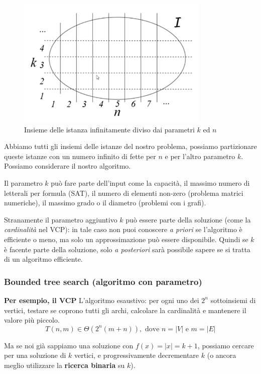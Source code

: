 \documentclass{article}
\begin{document}
\begin{figure}[H]
    \centering
    \includegraphics[scale=0.7]{images/param_coplx.png}
    \caption{Insieme delle istanza infinitamente diviso dai parametri $k$ ed $n$}
\end{figure}

Abbiamo tutti gli insiemi delle istanze del nostro problema, possiamo partizionare queste
istanze con un numero infinito di fette per $n$ e per l'altro parametro $k$. Possiamo
considerare il nostro algoritmo.

Il parametro $k$ può fare parte dell'input come la capacità, il massimo numero di
letterali per formula (SAT), il numero di elementi non-zero (problema matrici numeriche),
il massimo grado o il diametro (problemi con i grafi).

Stranamente il parametro aggiuntivo $k$ può essere parte della soluzione (come la \textit{
    cardinalità} nel VCP): in tale caso non puoi conoscere \textit{a priori} se l'algoritmo
è efficiente o meno, ma solo un approssimazione può essere disponibile. Quindi
se $k$ è facente parte della soluzione, solo \textit{a posteriori} sarà possibile
sapere se si tratta di un algoritmo efficiente.

\subsubsection{Bounded tree search (algoritmo con parametro)}
\noindent\textbf{Per esempio, il VCP}
\newline
L'algoritmo esaustivo: per ogni uno dei $2^n$ sottoinsiemi di vertici, testare se
coprono tutti gli archi, calcolare la cardinalità e mantenere il valore più piccolo.
$$T(n,m)\in\Theta(2^n(m+n)),\text{ dove }n=|V|\text{ e }m=|E|$$

Ma se noi già sappiamo una soluzione con $f(x)=|x|=k+1$, possiamo cercare per una soluzione
di $k$ vertici, e progressivamente decrementare $k$ (o ancora meglio utilizzare
la \textbf{ricerca binaria} su $k$).
\end{document}
